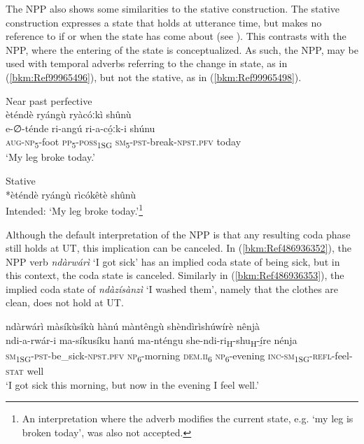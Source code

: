 The NPP also shows some similarities to the stative construction. The stative construction expresses a state that holds at utterance time, but makes no reference to if or when the state has come about (see ). This contrasts with the NPP, where the entering of the state is conceptualized. As such, the NPP, may be used with temporal adverbs referring to the change in state, as in (\ref{bkm:Ref99965496}), but not the stative, as in (\ref{bkm:Ref99965498}).

\ea
\label{bkm:Ref99965496}
Near past perfective\\
\glll èténdè ryángù ryàcóːkì shûnù\\
e-∅-ténde    ri-angú  ri-a-có̲ːk-i      shúnu\\
\textsc{aug}-\textsc{np}\textsubscript{5}-foot  \textsc{pp}\textsubscript{5}-\textsc{poss}\textsubscript{1SG}  \textsc{sm}\textsubscript{5}-\textsc{pst}-break-\textsc{npst}.\textsc{pfv}  today\\
\glt ‘My leg broke today.’
\z

\ea
\label{bkm:Ref99965498}
  Stative\\
*èténdè ryángù rìcókêtè shûnù\\
Intended: ‘My leg broke today.’\footnote{An interpretation where the adverb modifies the current state, e.g. ‘my leg is broken today’, was also not accepted.}
\z

Although the default interpretation of the NPP is that any resulting coda phase still holds at UT, this implication can be canceled. In (\ref{bkm:Ref486936352}), the NPP verb \textit{ndàrwárì} ‘I got sick’ has an implied coda state of being sick, but in this context, the coda state is canceled. Similarly in (\ref{bkm:Ref486936353}), the implied coda state of \textit{ndàzísànzì} ‘I washed them’, namely that the clothes are clean, does not hold at UT.

\ea
\label{bkm:Ref486936352}
ndàrwárì màsíkùsîkù hànú màntêngù shèndìrìshúwírè nênjà\\
\gll ndi-a-rwár-i        ma-síkusíku hanú    ma-nténgu  she-ndi-ri\textsubscript{H}-shu\textsubscript{H}-í̲re  nénja\\
\textsc{sm}\textsubscript{1SG}-\textsc{pst}-be\_sick-\textsc{npst}.\textsc{pfv}  \textsc{np}\textsubscript{6}-morning
\textsc{dem}.\textsc{ii}\textsubscript{6}  \textsc{np}\textsubscript{6}-evening  \textsc{inc}-\textsc{sm}\textsubscript{1SG}-\textsc{refl}-feel-\textsc{stat}  well\\
\glt ‘I got sick this morning, but now in the evening I feel well.’
\z

